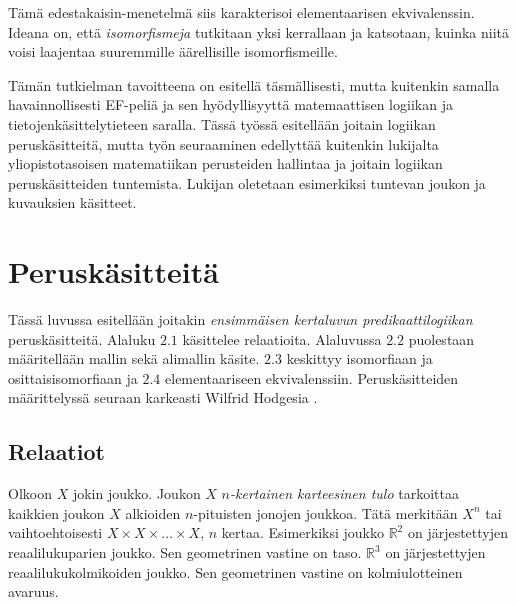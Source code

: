 \documentclass[finnish]{tktltiki2}
\theoremstyle{definition}
\theoremstyle{remark}
\begin{document}
Tämä edestakaisin-menetelmä siis karakterisoi elementaarisen ekvivalenssin. Ideana on, että \textit{isomorfismeja} tutkitaan yksi kerrallaan ja katsotaan, kuinka niitä voisi laajentaa suuremmille äärellisille isomorfismeille.

Tämän tutkielman tavoitteena on esitellä täsmällisesti, mutta kuitenkin samalla havainnollisesti EF-peliä ja sen hyödyllisyyttä matemaattisen logiikan ja tietojenkäsittelytieteen saralla. Tässä työssä esitellään joitain logiikan peruskäsitteitä, mutta työn seuraaminen edellyttää kuitenkin lukijalta yliopistotasoisen matematiikan perusteiden hallintaa ja joitain logiikan peruskäsitteiden tuntemista. Lukijan oletetaan esimerkiksi tuntevan joukon ja kuvauksien käsitteet.

\section{Peruskäsitteitä}
Tässä luvussa esitellään joitakin \textit{ensimmäisen kertaluvun predikaattilogiikan} peruskäsitteitä. Alaluku $2.1$ käsittelee relaatioita. Alaluvussa $2.2$ puolestaan määritellään mallin sekä alimallin käsite. $2.3$ keskittyy isomorfiaan ja osittaisisomorfiaan ja $2.4$ elementaariseen ekvivalenssiin. Peruskäsitteiden määrittelyssä seuraan karkeasti Wilfrid Hodgesia \cite{Hod97}.

\subsection{Relaatiot}
Olkoon $X$ jokin joukko. Joukon $X$ $n$\textit{-kertainen karteesinen tulo} tarkoittaa kaikkien joukon $X$ alkioiden $n$-pituisten jonojen joukkoa. Tätä merkitään $X^n$ tai vaihtoehtoisesti $X \times X \times \ldots \times X$, $n$ kertaa. Esimerkiksi joukko $\mathbb{R}^2$ on järjestettyjen reaalilukuparien joukko. Sen geometrinen vastine on taso. $\mathbb{R}^3$ on järjestettyjen reaalilukukolmikoiden joukko. Sen geometrinen vastine on kolmiulotteinen avaruus. 
\end{document}
